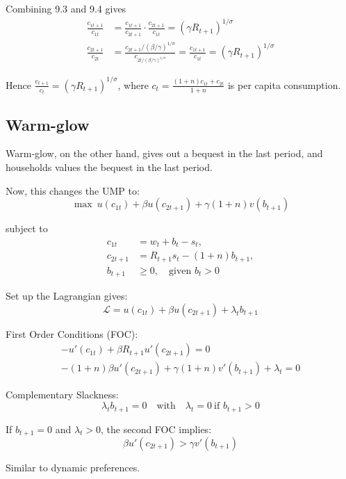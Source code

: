 \documentclass[twocolumn, fleqn]{article}
\begin{document}
			Combining 9.3 and 9.4 gives
			\begin{align*}
				\frac{c_{1t+1}}{c_{1t}} &= \frac{c_{1t+1}}{c_{2t+1}} \cdot \frac{c_{2t+1}}{c_{1t}} = (\gamma R_{t+1})
				^{1/\sigma}\\
				\frac{c_{2t+1}}{c_{2t}} &=
				\frac{c_{2t+1}/(\beta/\gamma)^{1/\sigma}}{c_{2t/(\beta/\gamma)^{1/\sigma}}}=\frac{c_{1t+1}}{c_{1t}} = (\gamma R_{t+1})^{1/\sigma}
			\end{align*}

			Hence $\frac{c_{t+1}}{c_{t}}=(\gamma R_{t+1})^{1/\sigma}$, where $c_t = \frac{(1+n)c_{1t}+c_{2t}}{1+n}$
			is per capita consumption.

		\subsection{Warm-glow}
			Warm-glow, on the other hand, gives out a bequest in the last period, and households values the bequest
			in the last period.

			Now, this changes the UMP to:
			\[
				\max \ u(c_{1t}) + \beta u(c_{2t+1}) + \gamma (1+n) v(b_{t+1})
			\]

			subject to
			\begin{align*}
					c_{1t} &= w_t + b_t - s_t, \\
					c_{2t+1} &= R_{t+1}s_t - (1+n)b_{t+1}, \\
					b_{t+1} &\geq 0, \quad \text{given } b_t > 0
			\end{align*}

			Set up the Lagrangian gives:
			\[
				\mathcal{L} = u(c_{1t}) + \beta u(c_{2t+1}) + \lambda_t b_{t+1}
			\]

			First Order Conditions (FOC):
			\begin{gather*}
			    -u'(c_{1t}) + \beta R_{t+1} u'(c_{2t+1}) = 0\\
			    -(1+n)\beta u'(c_{2t+1}) + \gamma(1+n)v'(b_{t+1}) + \lambda_t = 0
			\end{gather*}
			
			Complementary Slackness:
			\[
				\lambda_t b_{t+1} = 0 \quad \text{with} \quad \lambda_t = 0 \ \text{if } b_{t+1} > 0
			\]

			If \( b_{t+1} = 0 \) and \( \lambda_t > 0 \), the second FOC implies:
			\[
				\beta u'(c_{2t+1}) > \gamma v'(b_{t+1})
			\]

			Similar to dynamic preferences.
\end{document}
